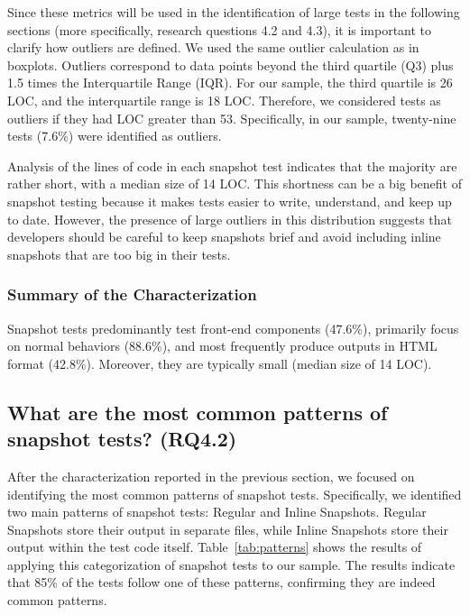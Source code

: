 \documentclass[
	msc, %
	english %
]{../ppgccufmg}
\begin{document}
        Since these metrics will be used in the identification of large tests in the following sections (more specifically, research questions 4.2 and 4.3), it is important to clarify how outliers are defined. We used the same outlier calculation as in boxplots. Outliers correspond to data points beyond the third quartile (Q3) plus 1.5 times the Interquartile Range (IQR). For our sample, the third quartile is 26 LOC, and the interquartile range is 18 LOC. Therefore, we considered tests as outliers if they had LOC greater than 53. Specifically, in our sample, twenty-nine tests (7.6\%) were identified as outliers.

        Analysis of the lines of code in each snapshot test indicates that the majority are rather short, with a median size of 14 LOC. This shortness can be a big benefit of snapshot testing because it makes tests easier to write, understand, and keep up to date. However, the presence of large outliers in this distribution suggests that developers should be careful to keep snapshots brief and avoid including inline snapshots that are too big in their tests.

        \subsubsection{Summary of the Characterization}

        Snapshot tests predominantly test front-end components (47.6\%), primarily focus on normal behaviors (88.6\%), and most frequently produce outputs in HTML format (42.8\%). Moreover, they are typically small (median size of 14 LOC).

        \subsection{What are the most common patterns of snapshot tests? (RQ4.2)}

        After the characterization reported in the previous section, we focused on identifying the most common patterns of snapshot tests. Specifically, we identified two main patterns of snapshot tests: Regular and Inline Snapshots. Regular Snapshots store their output in separate files, while Inline Snapshots store their output within the test code itself. Table~\ref{tab:patterns} shows the results of applying this categorization of snapshot tests to our sample. The results indicate that 85\% of the tests follow one of these patterns, confirming they are indeed common patterns.
\end{document}
